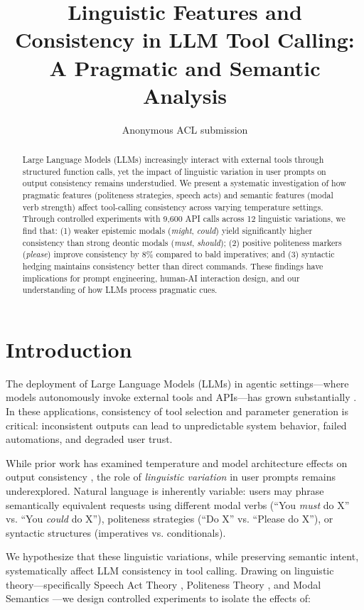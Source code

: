 \documentclass[11pt]{article}
\title{Linguistic Features and Consistency in LLM Tool Calling: \\
A Pragmatic and Semantic Analysis}
\author{Anonymous ACL submission}
\begin{document}
\maketitle

\begin{abstract}
Large Language Models (LLMs) increasingly interact with external tools through structured function calls, yet the impact of linguistic variation in user prompts on output consistency remains understudied. We present a systematic investigation of how pragmatic features (politeness strategies, speech acts) and semantic features (modal verb strength) affect tool-calling consistency across varying temperature settings. Through controlled experiments with 9,600 API calls across 12 linguistic variations, we find that: (1) weaker epistemic modals (\textit{might}, \textit{could}) yield significantly higher consistency than strong deontic modals (\textit{must}, \textit{should}); (2) positive politeness markers (\textit{please}) improve consistency by 8\% compared to bald imperatives; and (3) syntactic hedging maintains consistency better than direct commands. These findings have implications for prompt engineering, human-AI interaction design, and our understanding of how LLMs process pragmatic cues.
\end{abstract}

\section{Introduction}

The deployment of Large Language Models (LLMs) in agentic settings---where models autonomously invoke external tools and APIs---has grown substantially \cite{schick2023toolformer,qin2023tool}. In these applications, consistency of tool selection and parameter generation is critical: inconsistent outputs can lead to unpredictable system behavior, failed automations, and degraded user trust.

While prior work has examined temperature and model architecture effects on output consistency \cite{renze2024effect}, the role of \textit{linguistic variation} in user prompts remains underexplored. Natural language is inherently variable: users may phrase semantically equivalent requests using different modal verbs (``You \textit{must} do X'' vs. ``You \textit{could} do X''), politeness strategies (``Do X'' vs. ``Please do X''), or syntactic structures (imperatives vs. conditionals).

We hypothesize that these linguistic variations, while preserving semantic intent, systematically affect LLM consistency in tool calling. Drawing on linguistic theory---specifically Speech Act Theory \cite{austin1962things,searle1969speech}, Politeness Theory \cite{brown1987politeness}, and Modal Semantics \cite{kratzer1991modality}---we design controlled experiments to isolate the effects of:
\end{document}
